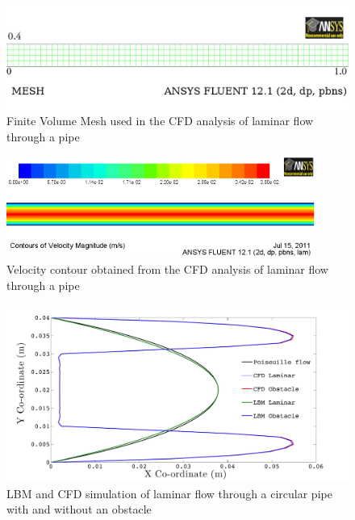 \begin{figure}[h]
\centering
\includegraphics[width=\textwidth]{Chapter3/figures/lbm/CFD_Mesh.png}
\caption{Finite Volume Mesh used in the CFD analysis of laminar flow through a pipe}
\label{fig:mesh}
\end{figure}


\begin{figure}[h]
\centering
\includegraphics[width=0.9\textwidth]{Chapter3/figures/lbm/CFD_Poiseuille.png}
\caption{Velocity contour obtained from the CFD analysis of laminar flow through a pipe}
\label{fig:cont}
\end{figure}


\begin{figure}[h]
\centering
\includegraphics[width=\textwidth]{Chapter3/figures/lbm/LBMCFD.pdf}
\caption{LBM and CFD simulation of laminar flow through a circular pipe with and without an obstacle}
\label{fig:LBM}
\end{figure}

